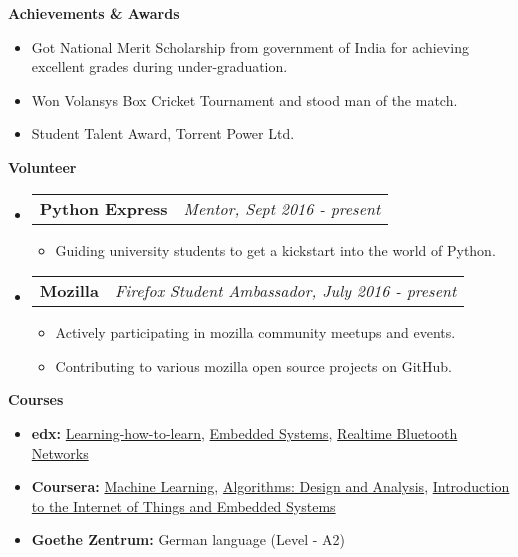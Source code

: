 \documentclass[letterpaper,10pt]{article}
\makeatletter
\newcommand{\resitem}[1]{\item #1 \vspace{-2pt}}
\newcommand{\resheading}[1]{{\large \colorbox{mygrey}{\begin{minipage}{\textwidth}{\textbf{#1 \vphantom{p\^{E}}}}\end{minipage}}}}
\newcommand{\ressubheading}[4]{
\begin{tabular*}{7.0in}{l@{\extracolsep{\fill}}r}
		\textbf{#1} & \textit{#4} \\
\end{tabular*}\vspace{-6pt}}
\makeatother
\begin{document}
\resheading{Achievements \& Awards}
\begin{itemize}
	\item Got National Merit Scholarship from government of India for achieving excellent grades during under-graduation.
	\item Won Volansys Box Cricket Tournament and stood man of the match.
	\item Student Talent Award, Torrent Power Ltd.
\end{itemize}

\resheading{Volunteer}
\begin{itemize}

\item
	\ressubheading{Python Express}{Remote}{Mentor}{Mentor, Sept 2016 - present}
	\begin{itemize}
		\resitem{Guiding university students to get a kickstart into the world of Python.}
	\end{itemize}
	
\item
	\ressubheading{Mozilla}{Remote}{Firefox Student Ambassador}{Firefox Student Ambassador, July 2016 - present}
	\begin{itemize}
		\resitem{Actively participating in mozilla community meetups and events.}
		\resitem{Contributing to various mozilla open source projects on GitHub.}
	\end{itemize}
	
\end{itemize}

\resheading{Courses}
    \begin{itemize}
        \item \textbf{edx:} \href{https://www.coursera.org/learn/learning-how-to-learn}
                            {Learning-how-to-learn},
                            \href{https://www.edx.org/course/embedded-systems-shape-world-utaustinx-ut-6-03x}
                            {Embedded Systems},
                            \href{https://www.edx.org/course/real-time-bluetooth-networks-shape-world-utaustinx-ut-rtbn-12-01x}{Realtime Bluetooth Networks}
                                    
        \item \textbf{Coursera:}                            \href{https://www.coursera.org/learn/machine-learning}{Machine Learning},
        \href{https://www.coursera.org/specializations/algorithms}{Algorithms: Design and Analysis},
        \href{https://www.coursera.org/learn/iot}{Introduction to the Internet of Things and Embedded Systems}
                                 
        \item \textbf{Goethe Zentrum:} German language (Level - A2)
    \end{itemize}
    
\end{document}
